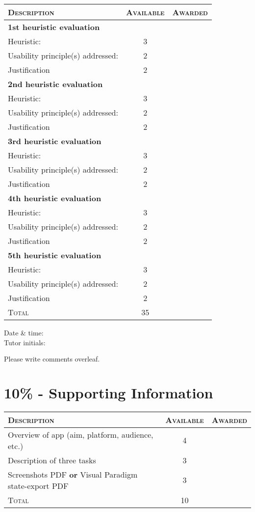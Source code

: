 \documentclass[11pt,a4paper]{report}
\begin{document}
\noindent\begin{tabular}{p{11cm}|c|c}
    \textsc{Description} & \textsc{Available} & \textsc{Awarded} \\
    \hline
    \hline
    \textbf{1st heuristic evaluation} & & \\
    Heuristic:& 3 & \\
    Usability principle(s) addressed:& 2 & \\
    Justification & 2 & \\
    \hline
    \textbf{2nd heuristic evaluation} & & \\
    Heuristic:& 3 & \\
    Usability principle(s) addressed:& 2 & \\
    Justification & 2 & \\
    \hline
    \textbf{3rd heuristic evaluation} & & \\
    Heuristic:& 3 & \\
    Usability principle(s) addressed:& 2 & \\
    Justification & 2 & \\
    \hline
    \textbf{4th heuristic evaluation} & & \\
    Heuristic:& 3 & \\
    Usability principle(s) addressed:& 2 & \\
    Justification & 2 & \\
    \hline
    \textbf{5th heuristic evaluation} & & \\
    Heuristic:& 3 & \\
    Usability principle(s) addressed:& 2 & \\
    Justification & 2 & \\
    \hline
    \hline
    \textsc{Total} & 35 & 
\end{tabular}
 
\begin{description}
    \item[Date \& time:]
    \item[Tutor initials:]
\end{description}
Please write comments overleaf.

\section*{10\% - Supporting Information}

\begin{tabular}{p{11cm}|c|c}
    \textsc{Description} & \textsc{Available} & \textsc{Awarded} \\
    \hline
    \hline
    Overview of app (aim, platform, audience, etc.) & 4 &  \\
    \hline
    Description of three tasks & 3 & \\
    \hline
    Screenshots PDF \textbf{or} Visual Paradigm state-export PDF & 3 & \\ 
    \hline
    \hline
    \textsc{Total} & 10 &
\end{tabular}
\end{document}
